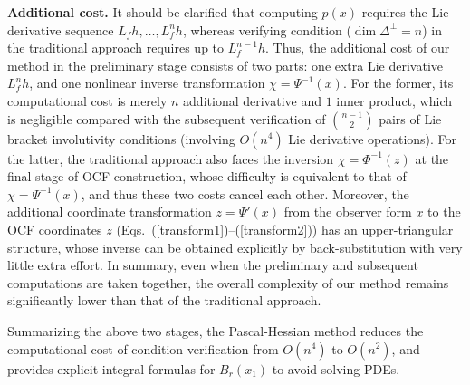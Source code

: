 \documentclass[11pt]{article}
\begin{document}

\textbf{Additional cost.} It should be clarified that computing $p(x)$ requires the Lie derivative sequence $L_f h,\ldots,L_f^n h$, whereas verifying condition ($\dim\Delta^\perp=n$) in the traditional approach requires up to $L_f^{n-1}h$. Thus, the additional cost of our method in the preliminary stage consists of two parts: one extra Lie derivative $L_f^n h$, and one nonlinear inverse transformation $\chi=\Psi^{-1}(x)$. For the former, its computational cost is merely $n$ additional derivative and $1$ inner product, which is negligible compared with the subsequent verification of $\binom{n-1}{2}$ pairs of Lie bracket involutivity conditions (involving $O(n^4)$ Lie derivative operations). For the latter, the traditional approach also faces the inversion $\chi=\Phi^{-1}(z)$ at the final stage of OCF construction, whose difficulty is equivalent to that of $\chi=\Psi^{-1}(x)$, and thus these two costs cancel each other. Moreover, the additional coordinate transformation $z=\Psi'(x)$ from the observer form $x$ to the OCF coordinates $z$ (Eqs.~(\ref{transform1})--(\ref{transform2})) has an upper-triangular structure, whose inverse can be obtained explicitly by back-substitution with very little extra effort. In summary, even when the preliminary and subsequent computations are taken together, the overall complexity of our method remains significantly lower than that of the traditional approach.

Summarizing the above two stages, the Pascal-Hessian method reduces the computational cost of condition verification from $O(n^4)$ to $O(n^2)$, and provides explicit integral formulas for $B_r(x_1)$ to avoid solving PDEs.
\end{document}

